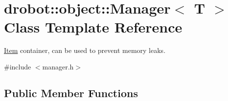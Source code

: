 \hypertarget{classdrobot_1_1object_1_1Manager}{\section{drobot\-:\-:object\-:\-:Manager$<$ T $>$ Class Template Reference}
\label{classdrobot_1_1object_1_1Manager}
}


\hyperlink{classdrobot_1_1object_1_1Item}{Item} container, can be used to prevent memory leaks.  




{\ttfamily \#include $<$manager.\-h$>$}

\subsection*{Public Member Functions}
